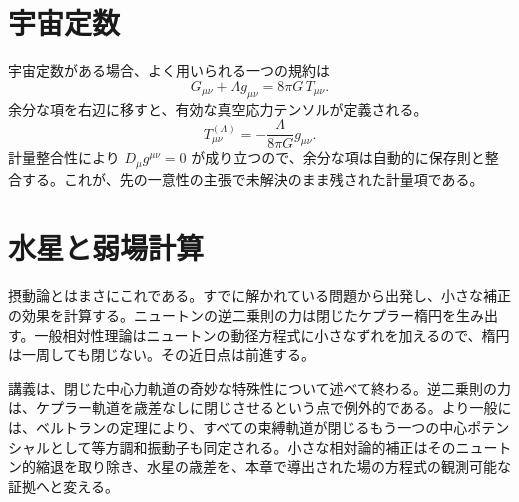 \section{宇宙定数}

\begin{classroomqa}
\end{classroomqa}

宇宙定数がある場合、よく用いられる一つの規約は
\begin{equation}
 G_{\mu\nu}+\Lambda g_{\mu\nu}
 =
 8\pi G\,T_{\mu\nu}.
\end{equation}
余分な項を右辺に移すと、有効な真空応力テンソルが定義される。
\begin{equation}
 T_{\mu\nu}^{(\Lambda)}
 =
 -\frac{\Lambda}{8\pi G}g_{\mu\nu}.
\end{equation}
計量整合性により \(D_\mu g^{\mu\nu}=0\) が成り立つので、余分な項は自動的に保存則と整合する。これが、先の一意性の主張で未解決のまま残された計量項である。

\section{水星と弱場計算}

\begin{classroomqa}
\end{classroomqa}

摂動論とはまさにこれである。すでに解かれている問題から出発し、小さな補正の効果を計算する。ニュートンの逆二乗則の力は閉じたケプラー楕円を生み出す。一般相対性理論はニュートンの動径方程式に小さなずれを加えるので、楕円は一周しても閉じない。その近日点は前進する。

講義は、閉じた中心力軌道の奇妙な特殊性について述べて終わる。逆二乗則の力は、ケプラー軌道を歳差なしに閉じさせるという点で例外的である。より一般には、ベルトランの定理により、すべての束縛軌道が閉じるもう一つの中心ポテンシャルとして等方調和振動子も同定される。小さな相対論的補正はそのニュートン的縮退を取り除き、水星の歳差を、本章で導出された場の方程式の観測可能な証拠へと変える。